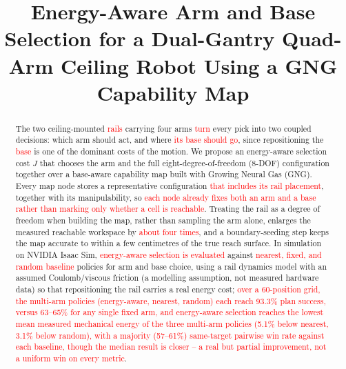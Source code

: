 \documentclass[conference]{IEEEtran}
\newcommand{\TODO}[1]{\textcolor{red}{[TODO: #1]}}
\begin{document}
\title{Energy-Aware Arm and Base Selection for a Dual-Gantry Quad-Arm Ceiling Robot Using a GNG Capability Map}

\author{
\IEEEauthorblockN{1\textsuperscript{st} \TODO{Given Name Surname}}
\IEEEauthorblockA{\textit{\TODO{dept. name of organization}} \\
\textit{\TODO{name of organization}}\\
\TODO{City, Country} \\
\TODO{email address or ORCID}}
}

\maketitle

\begin{abstract}
The two ceiling-mounted \textcolor{red}{rails} carrying four arms \textcolor{red}{turn} every pick into two coupled decisions:
which arm should act, and where \textcolor{red}{its base should go}, since repositioning the
\textcolor{red}{base} is one of the dominant costs of the motion. We propose an energy-aware
selection cost $J$ that chooses the arm and the full eight-degree-of-freedom (8-DOF)
configuration together over a base-aware capability map built with Growing Neural
Gas (GNG). Every map node stores a representative configuration \textcolor{red}{that includes its rail placement}, together with its
manipulability, so \textcolor{red}{each node already fixes both an arm and a base rather than marking only whether a cell is reachable}. Treating the rail as a
degree of freedom when building the map, rather than sampling the arm alone, enlarges
the measured reachable workspace by \textcolor{red}{about four times}, and a boundary-seeding step
keeps the map accurate to within a few centimetres of the true reach surface. In
simulation on NVIDIA Isaac Sim, \textcolor{red}{energy-aware
selection is evaluated} against \textcolor{red}{nearest, fixed, and random baseline} policies for
arm and base choice, using a rail dynamics model with an assumed Coulomb/viscous
friction (a modelling assumption, not measured hardware data) so that
repositioning the rail carries a real energy cost; \textcolor{red}{over a
60-position grid, the multi-arm policies (energy-aware, nearest, random) each
reach 93.3\% plan success, versus 63--65\% for any single fixed arm, and
energy-aware selection reaches the lowest mean measured mechanical energy of the
three multi-arm policies (5.1\% below nearest, 3.1\% below random), with a
majority (57--61\%) same-target pairwise win rate against each baseline, though
the median result is closer -- a real but partial improvement, not a uniform win
on every metric}.
\end{abstract}
\end{document}

